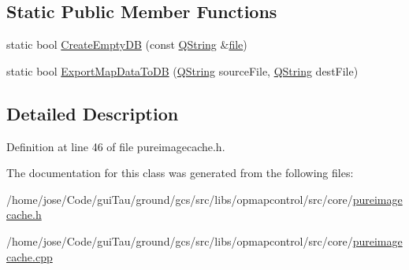 \subsection*{Static Public Member Functions}
\begin{DoxyCompactItemize}
\item 
static bool \hyperlink{group___o_p_map_widget_gac23ecdf49009e55e9e7358c990f32bfa}{Create\-Empty\-D\-B} (const \hyperlink{group___u_a_v_objects_plugin_gab9d252f49c333c94a72f97ce3105a32d}{Q\-String} \&\hyperlink{uavobjecttemplate_8m_a97c04efa65bcf0928abf9260bc5cbf46}{file})
\item 
static bool \hyperlink{group___o_p_map_widget_ga4cd3a5c37b5805594bf922e266312836}{Export\-Map\-Data\-To\-D\-B} (\hyperlink{group___u_a_v_objects_plugin_gab9d252f49c333c94a72f97ce3105a32d}{Q\-String} source\-File, \hyperlink{group___u_a_v_objects_plugin_gab9d252f49c333c94a72f97ce3105a32d}{Q\-String} dest\-File)
\end{DoxyCompactItemize}


\subsection{Detailed Description}


Definition at line 46 of file pureimagecache.\-h.



The documentation for this class was generated from the following files\-:\begin{DoxyCompactItemize}
\item 
/home/jose/\-Code/gui\-Tau/ground/gcs/src/libs/opmapcontrol/src/core/\hyperlink{pureimagecache_8h}{pureimagecache.\-h}\item 
/home/jose/\-Code/gui\-Tau/ground/gcs/src/libs/opmapcontrol/src/core/\hyperlink{pureimagecache_8cpp}{pureimagecache.\-cpp}\end{DoxyCompactItemize}
